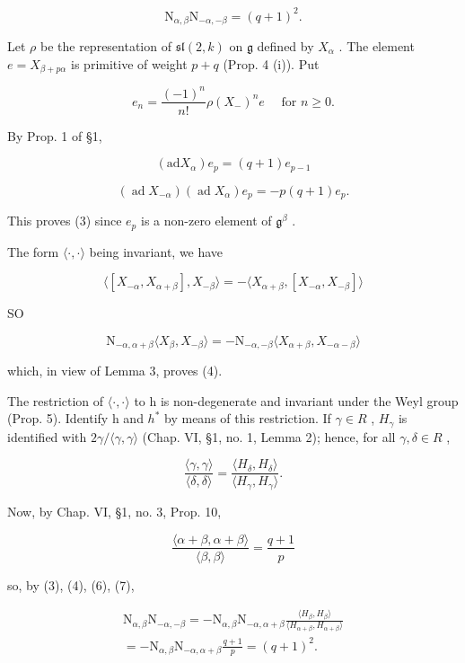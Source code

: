 \[
\mathrm{N} _ {\alpha , \beta} \mathrm{N} _ {- \alpha , - \beta} = (q + 1) ^ {2}.\tag{5}
\]

Let \(\rho\) be the representation of \(\mathfrak{sl}(2,k)\) on \(\mathfrak{g}\) defined by \(X_{\alpha}\) . The element \(e = X_{\beta + p\alpha}\) is primitive of weight \(p + q\) (Prop. 4 (i)). Put

\[
e _ {n} = \frac {(- 1) ^ {n}}{n !} \rho (X _ {-}) ^ {n} e \quad \text { for } n \geq 0.
\]

By Prop. 1 of §1,

\[
(\mathrm{ad} X _ {\alpha}) e _ {p} = (q + 1) e _ {p - 1}
\]

\[
(\operatorname{ad} X _ {- \alpha}) (\operatorname{ad} X _ {\alpha}) e _ {p} = - p (q + 1) e _ {p}.
\]

This proves (3) since \(e_p\) is a non-zero element of \(\mathfrak{g}^{\beta}\) .

The form \(\langle \cdot, \cdot \rangle\) being invariant, we have

\[
\langle [ X _ {- \alpha}, X _ {\alpha + \beta} ], X _ {- \beta} \rangle = - \langle X _ {\alpha + \beta}, [ X _ {- \alpha}, X _ {- \beta} ] \rangle
\]

SO

\[
\mathrm{N} _ {- \alpha , \alpha + \beta} \langle X _ {\beta}, X _ {- \beta} \rangle = - \mathrm{N} _ {- \alpha , - \beta} \langle X _ {\alpha + \beta}, X _ {- \alpha - \beta} \rangle
\]

which, in view of Lemma 3, proves (4).

The restriction of \(\langle\cdot,\cdot\rangle\) to h is non-degenerate and invariant under the Weyl group (Prop. 5). Identify h and \(h^{*}\) by means of this restriction. If \(\gamma\in R\) , \(H_{\gamma}\) is identified with \(2\gamma/\langle\gamma,\gamma\rangle\) (Chap. VI, §1, no. 1, Lemma 2); hence, for all \(\gamma,\delta\in R\) ,

\[
\frac {\langle \gamma , \gamma \rangle}{\langle \delta , \delta \rangle} = \frac {\langle H _ {\delta} , H _ {\delta} \rangle}{\langle H _ {\gamma} , H _ {\gamma} \rangle}.\tag{6}
\]

Now, by Chap. VI, §1, no. 3, Prop. 10,

\[
\frac {\langle \alpha + \beta , \alpha + \beta \rangle}{\langle \beta , \beta \rangle} = \frac {q + 1}{p}\tag{7}
\]

so, by (3), (4), (6), (7),

\[
\begin{array}{r} \mathrm{N} _ {\alpha , \beta} \mathrm{N} _ {- \alpha , - \beta} = - \mathrm{N} _ {\alpha , \beta} \mathrm{N} _ {- \alpha , \alpha + \beta} \frac {\langle H _ {\beta} , H _ {\beta} \rangle}{\langle H _ {\alpha + \beta} , H _ {\alpha + \beta} \rangle} \\ = - \mathrm{N} _ {\alpha , \beta} \mathrm{N} _ {- \alpha , \alpha + \beta} \frac {q + 1}{p} = (q + 1) ^ {2}. \end{array}
\]

